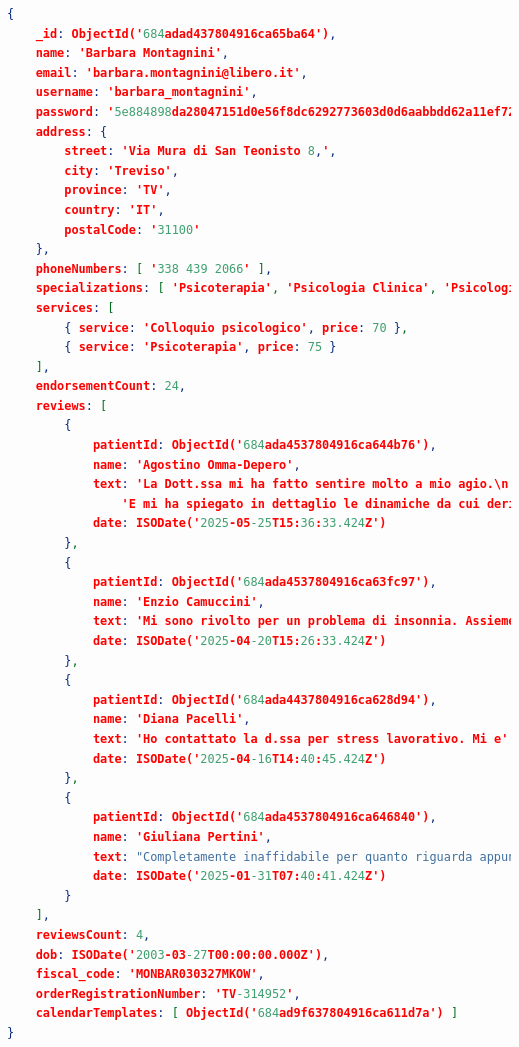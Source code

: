 \begin{lstlisting}[language=json, caption={Example of a Doctor Document}]
{
    _id: ObjectId('684adad437804916ca65ba64'),
    name: 'Barbara Montagnini',
    email: 'barbara.montagnini@libero.it',
    username: 'barbara_montagnini',
    password: '5e884898da28047151d0e56f8dc6292773603d0d6aabbdd62a11ef721d1542d8',
    address: {
        street: 'Via Mura di San Teonisto 8,',
        city: 'Treviso',
        province: 'TV',
        country: 'IT',
        postalCode: '31100'
    },
    phoneNumbers: [ '338 439 2066' ],
    specializations: [ 'Psicoterapia', 'Psicologia Clinica', 'Psicologia del Lavoro' ],
    services: [
        { service: 'Colloquio psicologico', price: 70 },
        { service: 'Psicoterapia', price: 75 }
    ],
    endorsementCount: 24,
    reviews: [
        {
            patientId: ObjectId('684ada4537804916ca644b76'),
            name: 'Agostino Omma-Depero',
            text: 'La Dott.ssa mi ha fatto sentire molto a mio agio.\n' +
                'E mi ha spiegato in dettaglio le dinamiche da cui derivava il mio problema',
            date: ISODate('2025-05-25T15:36:33.424Z')
        },
        {
            patientId: ObjectId('684ada4537804916ca63fc97'),
            name: 'Enzio Camuccini',
            text: 'Mi sono rivolto per un problema di insonnia. Assieme abbiamo cercato di capire l'origine e mi ha fornito strategie pratiche per migliorare la qualita del sonno senza farmaci.',
            date: ISODate('2025-04-20T15:26:33.424Z')
        },
        {
            patientId: ObjectId('684ada4437804916ca628d94'),
            name: 'Diana Pacelli',
            text: 'Ho contattato la d.ssa per stress lavorativo. Mi e' servito a riflettere sulle mie emozioni, in particolare sulla rabbia che non mi permetteva di essere sempre obiettivo. Ero arrivata con un senso di rivalsa verso la mia azienda sono uscita con strumenti utili per la mia vita non solo professionale. SUper conisgliata',
            date: ISODate('2025-04-16T14:40:45.424Z')
        },
        {
            patientId: ObjectId('684ada4537804916ca646840'),
            name: 'Giuliana Pertini',
            text: "Completamente inaffidabile per quanto riguarda appuntamenti e orari. Cambia continuamente ora e giorno dell'appuntamento con scuse varie...",
            date: ISODate('2025-01-31T07:40:41.424Z')
        }
    ],
    reviewsCount: 4,
    dob: ISODate('2003-03-27T00:00:00.000Z'),
    fiscal_code: 'MONBAR030327MKOW',
    orderRegistrationNumber: 'TV-314952',
    calendarTemplates: [ ObjectId('684ad9f637804916ca611d7a') ]
}
\end{lstlisting}

